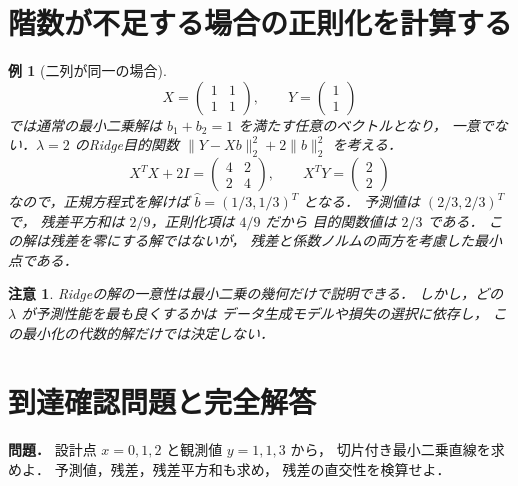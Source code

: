 \documentclass[a5paper,10pt,onecolumn]{jsarticle}
\theoremstyle{mathnotetheorem}
\newtheorem{example}[theorem]{例}
\newtheorem{remark}[theorem]{注意}
\begin{document}
\section{階数が不足する場合の正則化を計算する}
\begin{example}[二列が同一の場合]\label{ex:ridge-dup}
\[
 X=\begin{pmatrix}1&1\\1&1\end{pmatrix},\qquad
 Y=\begin{pmatrix}1\\1\end{pmatrix}
\]
では通常の最小二乗解は
$b_1+b_2=1$ を満たす任意のベクトルとなり，
一意でない．$\lambda=2$ のRidge目的関数
$\|Y-Xb\|_2^2+2\|b\|_2^2$ を考える．
\[
 X^TX+2I=
 \begin{pmatrix}4&2\\2&4\end{pmatrix},
 \qquad X^TY=\begin{pmatrix}2\\2\end{pmatrix}
\]
なので，正規方程式を解けば
$\widehat b=(1/3,1/3)^T$ となる．
予測値は $(2/3,2/3)^T$ で，
残差平方和は $2/9$，正則化項は $4/9$ だから
目的関数値は $2/3$ である．
この解は残差を零にする解ではないが，
残差と係数ノルムの両方を考慮した最小点である．
\end{example}
\begin{remark}
Ridgeの解の一意性は最小二乗の幾何だけで説明できる．
しかし，どの $\lambda$ が予測性能を最も良くするかは
データ生成モデルや損失の選択に依存し，
この最小化の代数的解だけでは決定しない．
\end{remark}

\section*{到達確認問題と完全解答}
\noindent\textbf{問題．}
設計点 $x=0,1,2$ と観測値 $y=1,1,3$ から，
切片付き最小二乗直線を求めよ．
予測値，残差，残差平方和も求め，
残差の直交性を検算せよ．
\end{document}
